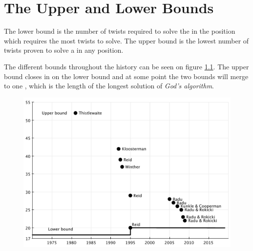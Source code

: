 \chapter{The Upper and Lower Bounds}
\label{chap:bounds}
The lower bound is the number of twists required to solve the \rubik{} in the position which requires the most twists to solve.
The upper bound is the lowest number of twists proven to solve a \rubik{} in any position.

The different bounds throughout the history can be seen on figure \ref{fig:upperLowerBound}.
The upper bound closes in on the lower bound and at some point the two bounds will merge to one \cite{rokicki09}, which is the length of the longest solution of \textit{God's algorithm}.

\begin{figure}[ht]
	\centering
		\includegraphics[scale = 0.5]{input/pics/bounds2.pdf}
	\caption{}
	\label{fig:upperLowerBound}
\end{figure}


\label{sec:bounds}


